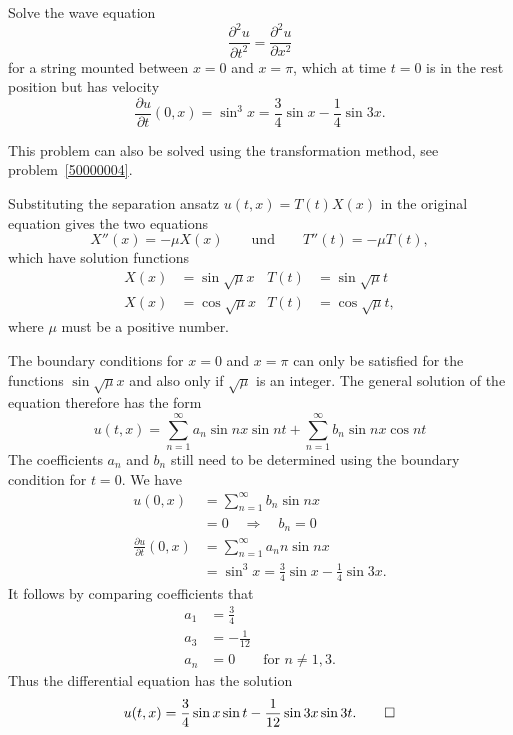 Solve the wave equation
\[
\frac{\partial^2 u}{\partial t^2}=\frac{\partial^2 u}{\partial x^2}
\]
for a string mounted between $x=0$ and $x=\pi$, which at time $t=0$
is in the rest position but has velocity
\[
\frac{\partial u}{\partial t}(0, x)
=
\sin^3 x=\frac34\sin x-\frac14\sin 3x.
\]

\begin{hinweis}
This problem can also be solved using the transformation method, see
problem~\ref{50000004}.
\end{hinweis}

\begin{loesung}
Substituting the separation ansatz 
$u(t,x)=T(t)X(x)$ in the original equation gives the two equations
\[
X''(x)=-\mu X(x)\qquad\text{und}\qquad T''(t)=-\mu T(t),
\]
which have solution functions
\[
\begin{aligned}
X(x)&=\sin\sqrt{\mu}x & T(t)&=\sin\sqrt{\mu}t\\
X(x)&=\cos\sqrt{\mu}x & T(t)&=\cos\sqrt{\mu}t,
\end{aligned}
\]
where $\mu$ must be a positive number.

The boundary conditions for $x=0$ and $x=\pi$ can only be satisfied for
the functions $\sin\sqrt{\mu}x$ and also only if $\sqrt{\mu}$ is an
integer.
The general solution of the equation therefore has the form
\[
u(t,x)
=
\sum_{n=1}^\infty a_n\sin nx \sin nt+\sum_{n=1}^\infty b_n\sin nx\cos nt
\]
The coefficients $a_n$ and $b_n$ still need to be determined using the
boundary condition for $t=0$.
We have
\begin{align*}
u(0,x)&=
\sum_{n=1}^\infty b_n\sin nx
\\
&=0\quad\Rightarrow\quad b_n=0
\\
\frac{\partial u}{\partial t}(0,x)
&=
\sum_{n=1}^\infty a_nn\sin nx
\\
&=
\sin^3 x=\frac34\sin x-\frac14\sin 3x.
\end{align*}
It follows by comparing coefficients that
\begin{align*}
a_1&=\frac34\\
a_3&=-\frac{1}{12}\\
a_n&=0\qquad\text{for $n\ne 1,3$.}
\end{align*}
Thus the differential equation has the solution
\[
u(t,x)
= \frac34\sin x \sin t -\frac1{12}\sin 3x \sin 3t.
\qedhere
\]
\end{loesung}
